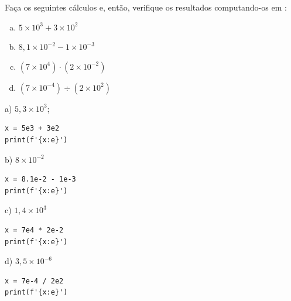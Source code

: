 \begin{exer}
  Faça os seguintes cálculos e, então, verifique os resultados computando-os em {\python}:
  \begin{enumerate}[a)]
  \item $5\times 10^{3} + 3\times 10^{2}$
  \item $8,1\times 10^{-2} - 1\times 10^{-3}$
  \item $\left(7\times 10^4\right)\cdot (2\times 10^{-2})$
  \item $\left(7\times 10^{-4}\right)\div (2\times 10^{2})$
  \end{enumerate}
\end{exer}
\begin{resp}
  a) $5,3\times 10^3$;

\begin{lstlisting}
x = 5e3 + 3e2
print(f'{x:e}')
\end{lstlisting}
  
  b) $8\times 10^{-2}$

\begin{lstlisting}
x = 8.1e-2 - 1e-3
print(f'{x:e}')
\end{lstlisting}

  c) $1,4\times 10^{3}$

\begin{lstlisting}
x = 7e4 * 2e-2
print(f'{x:e}')
\end{lstlisting}

  d) $3,5\times 10^{-6}$

\begin{lstlisting}
x = 7e-4 / 2e2
print(f'{x:e}')
\end{lstlisting}

\end{resp}


